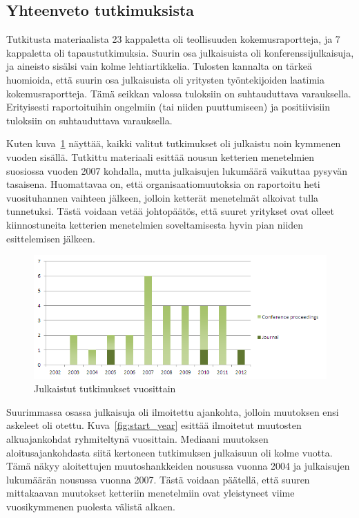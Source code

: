 \subsection{Yhteenveto tutkimuksista}

Tutkitusta materiaalista 23 kappaletta oli teollisuuden kokemusraportteja, ja 7
kappaletta oli tapaustutkimuksia. Suurin osa julkaisuista oli
konferenssijulkaisuja, ja aineisto sisälsi vain kolme lehtiartikkelia. Tulosten
kannalta on tärkeä huomioida, että suurin osa julkaisuista oli yritysten
työntekijoiden laatimia kokemusraportteja. Tämä seikkan valossa tuloksiin on
suhtauduttava varauksella. Erityisesti raportoituihin ongelmiin (tai niiden
puuttumiseen) ja positiivisiin tuloksiin on suhtauduttava varauksella.

Kuten kuva~\ref{fig:publications} näyttää, kaikki valitut tutkimukset oli
julkaistu noin kymmenen vuoden sisällä. Tutkittu materiaali esittää nousun
ketterien menetelmien suosiossa vuoden 2007 kohdalla, mutta julkaisujen
lukumäärä vaikuttaa pysyvän tasaisena. Huomattavaa on, että
organisaatiomuutoksia on raportoitu heti vuosituhannen vaihteen jälkeen, jolloin
ketterät menetelmät alkoivat tulla tunnetuksi. Tästä voidaan vetää johtopäätös,
että suuret yritykset ovat olleet kiinnostuneita ketterien menetelmien
soveltamisesta hyvin pian niiden esittelemisen jälkeen.

\begin{figure}[htb]
  \begin{center}
    \includegraphics[width=1\textwidth]{img/Publications}
    \caption{Julkaistut tutkimukset vuosittain}
    \label{fig:publications}
  \end{center}
\end{figure}

Suurimmassa osassa julkaisuja oli ilmoitettu ajankohta, jolloin muutoksen ensi
askeleet oli otettu. Kuva~\ref{fig:start_year} esittää ilmoitetut muutosten
alkuajankohdat ryhmiteltynä vuosittain. Mediaani muutoksen aloitusajankohdasta
siitä kertoneen tutkimuksen julkaisuun oli kolme vuotta. Tämä näkyy aloitettujen
muutoshankkeiden nousussa vuonna 2004 ja julkaisujen lukumäärän nousussa vuonna
2007. Tästä voidaan päätellä, että suuren mittakaavan muutokset ketteriin
menetelmiin ovat yleistyneet viime vuosikymmenen puolesta välistä alkaen.

